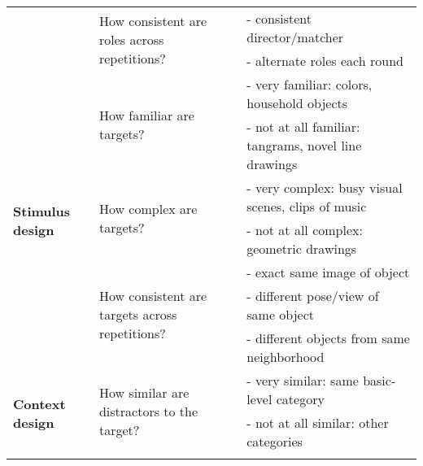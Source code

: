\documentclass[11pt, floatsintext, jou]{apa6}
\begin{document}
\begin{table*}[h]
{\begin{tabular}{@{}lll@{}}
                                            & \multirow{2}{*}{How consistent are roles across repetitions?}   & - consistent director/matcher                                              \\
                                            &                                                                 & - alternate roles each round                                               \\ \midrule
\multirow{7}{*}{\textbf{Stimulus design}}   & \multirow{2}{*}{How familiar are targets?}                      & - very familiar: colors, household objects                                 \\
                                            &                                                                 & - not at all familiar: tangrams, novel line drawings                       \\ \cmidrule(l){2-3} 
                                            & \multirow{2}{*}{How complex are targets?}                       & - very complex: busy visual scenes, clips of music                         \\
                                            &                                                                 & - not at all complex: geometric drawings                                   \\ \cmidrule(l){2-3} 
                                            & \multirow{3}{*}{How consistent are targets across repetitions?} & - exact same image of object                                               \\
                                            &                                                                 & - different pose/view of same object                                       \\
                                            &                                                                 & - different objects from same neighborhood                                 \\ \midrule
\multirow{5}{*}{\textbf{Context design}}    & \multirow{2}{*}{How similar are distractors to the target?}     & - very similar: same basic-level category                                  \\
                                            &                                                                 & - not at all similar: other categories                                     \\ \cmidrule(l){2-3} 

\end{tabular}}
\end{table*}
\end{document}
